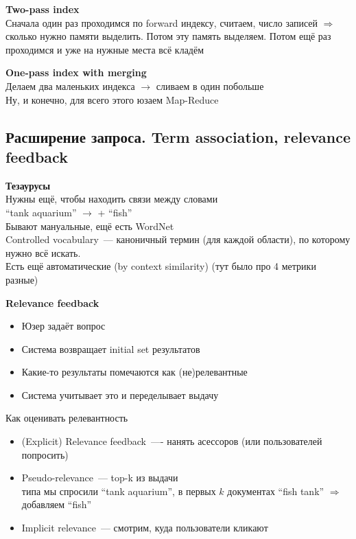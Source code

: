 \documentclass[12pt]{article}
\def\SO{\Rightarrow}          %
\begin{document}
    \smallskip\smallskip
    {\bf Two-pass index}\\
      Сначала один раз проходимся по forward индексу, считаем, число записей $\SO$ сколько нужно памяти выделить. Потом эту память выделяем. Потом ещё раз проходимся и уже на нужные места всё кладём\

    \smallskip\smallskip
    {\bf One-pass index with merging}\\
      Делаем два маленьких индекса $\to$ сливаем в один побольше\\
    Ну, и конечно, для всего этого юзаем Map-Reduce
    \pagebreak

  \subsection{Расширение запроса. Term association, relevance feedback}
    {\bf Тезаурусы}\\
      Нужны ещё, чтобы находить связи между словами\\
      ``tank aquarium'' $\to$ + ``fish''\\
      Бывают мануальные, ещё есть WordNet\\
      Controlled vocabulary~--- каноничный термин (для каждой области), по которому нужно всё искать.\\
      Есть ещё автоматические (by context similarity) (тут было про 4 метрики разные)

    \smallskip\smallskip
    {\bf Relevance feedback}
      \begin{itemize}
          \item Юзер задаёт вопрос
          \item Система возвращает initial set результатов
          \item Какие-то результаты помечаются как (не)релевантные
          \item Система учитывает это и переделывает выдачу
      \end{itemize}
    \smallskip
      Как оценивать релевантность
        \begin{itemize}
            \item (Explicit) Relevance feedback~---- нанять асессоров (или пользователей попросить)
            \item Pseudo-relevance~--- top-k из выдачи\\
            типа мы спросили ``tank aquarium'', в первых $k$ документах ``fish tank'' $\SO$ добавляем ``fish'' 
            \item Implicit relevance~--- смотрим, куда пользователи кликают
        \end{itemize}
\end{document}
